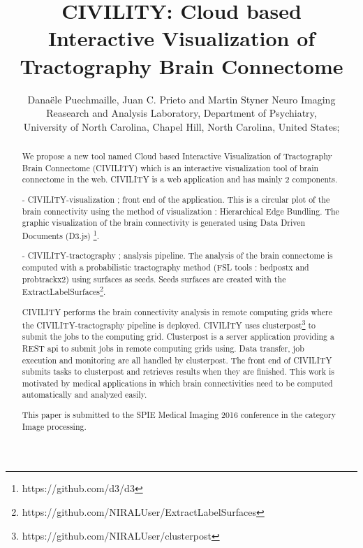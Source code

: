 \documentclass[]{spie}  %
\title{CIVILITY: Cloud based Interactive Visualization of Tractography Brain Connectome}
\author{Dana\"{e}le Puechmaille\supit{a}, Juan C. Prieto\supit{a} and Martin Styner\supit{a}
\skiplinehalf
\supit{a}Neuro Imaging Reasearch and Analysis Laboratory, Department of Psychiatry, \\
 University of North Carolina, Chapel Hill, North Carolina, United States;
}
\begin{document}
 
  \maketitle 

\begin{abstract}

We propose a new tool named Cloud based Interactive Visualization of Tractography Brain Connectome (CIVILITY) which is an interactive visualization tool of brain connectome in the web.
CIVILITY is a web application and has mainly 2 components.

- CIVILITY-visualization ; front end of the application. This is a circular plot of the brain connectivity using the method of visualization : Hierarchical Edge Bundling. The graphic visualization of the brain connectivity is generated using Data Driven Documents (D3.js) \footnote{https://github.com/d3/d3}.

- CIVILITY-tractography ; analysis pipeline. The analysis of the brain connectome is computed with a probabilistic tractography method (FSL tools : bedpostx and probtrackx2) using surfaces as seeds. Seeds surfaces are created with the ExtractLabelSurfaces\footnote{https://github.com/NIRALUser/ExtractLabelSurfaces}.

CIVILITY performs the brain connectivity analysis in remote computing grids where the CIVILITY-tractography pipeline is deployed. CIVILITY uses clusterpost\footnote{https://github.com/NIRALUser/clusterpost} to submit the jobs to the computing grid. Clusterpost is a server application providing a REST api to submit jobs in remote computing grids using. Data transfer, job execution and monitoring are all handled by clusterpost.
The front end of CIVILITY submits tasks to clusterpost and retrieves results when they are finished.
This work is motivated by medical applications in which brain connectivities need to be computed automatically and analyzed easily.

This paper is submitted to the SPIE Medical Imaging 2016 conference in the category Image processing. 

\end{abstract}



\end{document}
